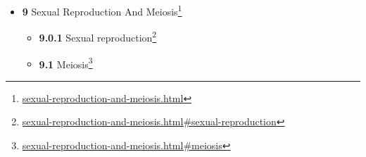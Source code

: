 \documentclass[
]{article}
\providecommand{\tightlist}{%
  \setlength{\itemsep}{0pt}\setlength{\parskip}{0pt}}
\providecommand{\tightlist}{%
  \setlength{\itemsep}{0pt}\setlength{\parskip}{0pt}}
\let\rmarkdownfootnote\footnote%
\def\footnote{\protect\rmarkdownfootnote}
\renewcommand{\href}[2]{#2\footnote{\url{#1}}}
\theoremstyle{definition}
\theoremstyle{definition}
\theoremstyle{definition}
\theoremstyle{remark}
\begin{document}
\begin{itemize}
\begin{itemize}
    \begin{itemize}
    \tightlist
    \item
      \href{the-cell-cycle-and-cell-division.html\#interphase-1}{\emph{}\textbf{8.5.1}
      Interphase}
    \item
      \href{the-cell-cycle-and-cell-division.html\#preprophase-plant-cells}{\emph{}\textbf{8.5.2}
      Preprophase (plant cells)}
    \item
      \href{the-cell-cycle-and-cell-division.html\#prophase}{\emph{}\textbf{8.5.3}
      Prophase}
    \item
      \href{the-cell-cycle-and-cell-division.html\#prometaphase}{\emph{}\textbf{8.5.4}
      Prometaphase}
    \item
      \href{the-cell-cycle-and-cell-division.html\#metaphase}{\emph{}\textbf{8.5.5}
      Metaphase}
    \item
      \href{the-cell-cycle-and-cell-division.html\#anaphase}{\emph{}\textbf{8.5.6}
      Anaphase}
    \item
      \href{the-cell-cycle-and-cell-division.html\#telophase}{\emph{}\textbf{8.5.7}
      Telophase}
    \item
      \href{the-cell-cycle-and-cell-division.html\#cytokinesis}{\emph{}\textbf{8.5.8}
      Cytokinesis}
    \end{itemize}
  \item
    \href{the-cell-cycle-and-cell-division.html\#regulation-of-the-eukaryotic-cell-cycle}{\emph{}\textbf{8.6}
    Regulation of The Eukaryotic Cell Cycle}

    \begin{itemize}
    \tightlist
    \item
      \href{the-cell-cycle-and-cell-division.html\#role-of-cyclins-and-cdks}{\emph{}\textbf{8.6.1}
      Role of cyclins and CDKs}
    \item
      \href{the-cell-cycle-and-cell-division.html\#cell-cycle-checkpoints}{\emph{}\textbf{8.6.2}
      Cell Cycle Checkpoints}
    \item
      \href{the-cell-cycle-and-cell-division.html\#role-in-tumor-formation}{\emph{}\textbf{8.6.3}
      Role in Tumor Formation}
    \end{itemize}
  \end{itemize}
\item
  \href{sexual-reproduction-and-meiosis.html}{\emph{}\textbf{9} Sexual
  Reproduction And Meiosis}

  \begin{itemize}
  \tightlist
  \item
    \href{sexual-reproduction-and-meiosis.html\#sexual-reproduction}{\emph{}\textbf{9.0.1}
    Sexual reproduction}
  \item
    \href{sexual-reproduction-and-meiosis.html\#meiosis}{\emph{}\textbf{9.1}
    Meiosis}


\end{itemize}
\end{itemize}
\end{document}
